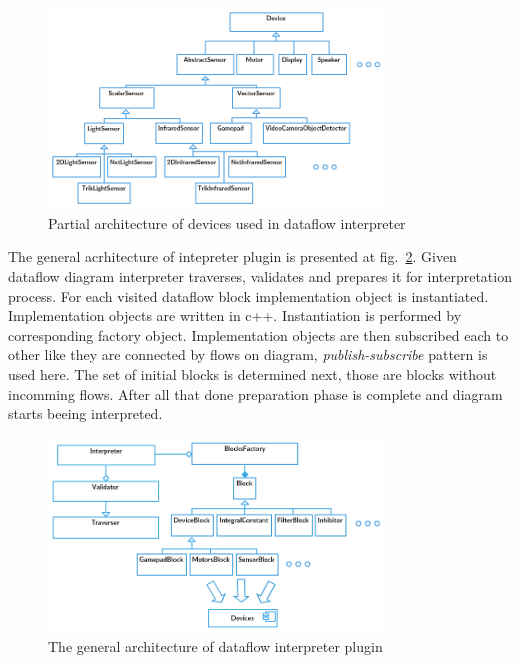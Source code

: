 \documentclass[conference,compsoc]{IEEEtran}
\begin{document}
\begin{figure}[ht]
	\centering
	\includegraphics[width=3.5in]{Devices.png}
	\caption{Partial architecture of devices used in dataflow interpreter}
	\label{image:devices-architecture}
\end{figure}

The general acrhitecture of intepreter plugin is presented at fig.~\ref{image:interpreter-architecture}. Given dataflow diagram interpreter traverses, validates and prepares it for interpretation process. For each visited dataflow block implementation object is instantiated. Implementation objects are written in c++. Instantiation is performed by corresponding factory object. Implementation objects are then subscribed each to other like they are connected by flows on diagram, \textit{publish-subscribe} pattern is used here. The set of initial blocks is determined next, those are blocks without incomming flows. After all that done preparation phase is complete and diagram starts beeing interpreted.

\begin{figure}[ht]
	\centering
	\includegraphics[width=3.5in]{Interpreter.png}
	\caption{The general architecture of dataflow interpreter plugin}
	\label{image:interpreter-architecture}
\end{figure}
\end{document}
